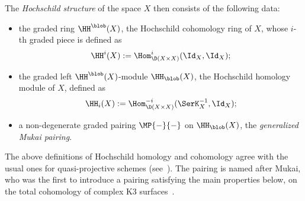 The {\em Hochschild structure} of the space $X$ then consists of the
following data:
\begin{itemize}
\item the graded ring $\HH^\blob(X)$, the Hochschild cohomology ring of
  $X$, whose $i$-th graded piece is defined as
  \[ \HH^i(X) := \Hom_{\D(X\times X)}^i(\Id_X, \Id_X); \]
\item the graded left $\HH^\blob(X)$-module $\HH_\blob(X)$, the
  Hochschild homology module of $X$, defined as
  \[ \HH_i(X) := \Hom_{\D(X\times X)}^{-i}(\SerK_X^{-1}, \Id_X); \]
\item a non-degenerate graded pairing $\MP{{-}}{{-}}$ on
  $\HH_\blob(X)$, the {\em generalized Mukai pairing}.
\end{itemize}

The above definitions of Hochschild homology and cohomology agree with
the usual ones for quasi-projective schemes (see~\cite{CalHH2}).  The
pairing is named after Mukai, who was the first to introduce a pairing
satisfying the main properties below, on the total cohomology of
complex K3 surfaces~\cite{MukK3}.

